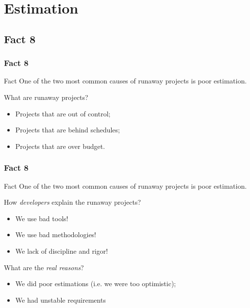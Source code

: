 \documentclass{beamer}
\begin{document}
\section{Estimation}

\subsection{Fact 8}
\begin{frame}
    \frametitle{Fact 8}
    \begin{block}{Fact}
    One of the two most common causes of runaway projects is poor estimation.
    \end{block}
    \pause

    What are runaway projects?
    \begin{itemize}
        \item Projects that are out of control;
        \pause
        \item Projects that are behind schedules;
        \pause
        \item Projects that are over budget.
    \end{itemize}
\end{frame}

\begin{frame}
    \frametitle{Fact 8}
    \begin{block}{Fact}
    One of the two most common causes of runaway projects is poor estimation.
    \end{block}
    \pause

    How \textit{developers} explain the runaway projects?
    \pause
    \begin{itemize}
        \item We use bad tools!
        \pause
        \item We use bad methodologies!
        \pause
        \item We lack of discipline and rigor!
    \end{itemize}
    \bigskip

    \pause
    What are the \textit{real reasons}?
    \begin{itemize}
        \item We did poor estimations (i.e. we were too optimistic);
        \pause
        \item We had unstable requirements
    \end{itemize}
\end{frame}
\end{document}
